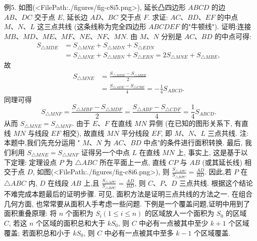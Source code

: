 例5. 如图(<FilePath:./figures/fig-c8i5.png>), 延长凸四边形 $A B C D$ 的边 $A B 、 D C$ 交于点 $E$, 延长边 $A D 、 B C$ 交于点 $F$. 求证: $A C 、 B D 、 E F$ 的中点 $M 、 N 、 L$ 这三点共线 (这条线称为完全四边形 $A B C D E F$ 的"牛顿线").
证明:连接 $M B 、 M D 、 M E 、 M F 、 N E 、 N F 、 M N$.
由 $M 、 N$ 分别是 $A C 、 B D$ 的中点可得:
$$
\begin{aligned}
S_{\triangle M D E} & =S_{\triangle M N E}+S_{\triangle M D N}+S_{\triangle E D N} \\
& =S_{\triangle M N E}+S_{\triangle M B N}+S_{\triangle E B N}=2 S_{\triangle M N E}+S_{\triangle M B E},
\end{aligned}
$$
故
$$
\begin{aligned}
S_{\triangle M N E} & =\frac{S_{\triangle M D E}-S_{\triangle M B E}}{2} \\
& =\frac{S_{\triangle A D E}-S_{\triangle C B E}}{4}=-\frac{1}{4} S_{A B C D} .
\end{aligned}
$$
同理可得
$$
S_{\triangle M N F}=\frac{S_{\triangle M B F}-S_{\triangle M D F}}{2}=\frac{S_{\triangle A B F}-S_{\triangle C D F}}{4}=\frac{1}{4} S_{A B C D} .
$$
从而 $S_{\triangle M N E}=S_{\triangle M N F}$.
由于 $E 、 F$ 在直线 $M N$ 异侧 (在已知的图形关系下, 有直线 $M N$ 与线段 $E F$ 相交), 故直线 $M N$ 平分线段 $E F$, 即 $M 、 N 、 L$ 三点共线.
注:本题中,我们先充分运用 " $M 、 N$ 为 $A C 、 B D$ 中点"的条件进行面积转换.
最后, 我们利用 $S_{\triangle M N E}= S_{\triangle M N F}$ 证得另一个中点 $L$ 在直线 $M N$ 上, 事实上, 这是基于以下定理:
定理设点 $P$ 为 $\triangle A B C$ 所在平面上一点, 直线 $C P$ 与 $A B$ (或其延长线) 相交于点 $D$, 如图(<FilePath:./figures/fig-c8i6.png>), 则 $\frac{S_{\triangle A P C}}{S_{\triangle B P C}}=\frac{A D}{B D}$.
因此,若 $P$ 在 $\triangle A B C$ 内, $D$ 在线段 $A B$ 上,且 $\frac{S_{\triangle A P C}}{S_{\triangle B P C}}=\frac{A D}{B D}$, 则 $C 、 P 、 D$ 三点共线.
根据这个结论不难完成本题最后的证明步骤.
可见, 面积方法是证明三点共线的方法之一.
在组合几何方面, 也常常要从面积人手考虑一些问题.
下例是一个覆盖问题,证明中用到了面积重叠原理:
将 $n$ 个面积为 $S_i(1 \leqslant i \leqslant n)$ 的区域放人一个面积为 $S_0$ 的区域 $C$, 若这 $n$ 个区域的面积总和大于 $k S_0$, 则 $C$ 中必有一点被其中至少 $k+1$ 个区域覆盖; 若面积总和小于 $k S_0$, 则 $C$ 中必有一点被其中至多 $k-1$ 个区域覆盖.



